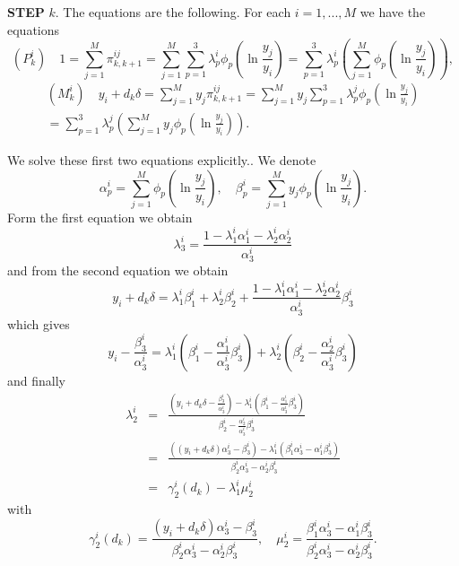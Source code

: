 \documentclass[a4paper]{article}
\begin{document}
\textbf{STEP} $k.$ The equations are the following. For each $i=1,...,M$ we
have the equations
\[
(P_{k}^{i})\quad 1 =\sum_{j=1}^{M}\pi
_{k,k+1}^{ij}=\sum_{j=1}^{M}\sum_{p=1}^{3}\lambda _{p}^{i}\phi _{p}(\ln
\frac{y_{j}}{y_{i}})=\sum_{p=1}^{3}\lambda _{p}^{i}\left( \sum_{j=1}^{M}\phi
_{p}(\ln \frac{y_{j}}{y_{i}})\right) ,\]
\begin{multline*}
(M_{k}^{i})\quad y_{i}+d_{k}\delta =\sum_{j=1}^{M}y_{j}\pi
_{k,k+1}^{ij}=\sum_{j=1}^{M}y_{j}\sum_{p=1}^{3}\lambda _{p}^{j}\phi _{p}(\ln
\frac{y_{j}}{y_{i}})\\=\sum_{p=1}^{3}\lambda _{p}^{j}\left(
\sum_{j=1}^{M}y_{j}\phi _{p}(\ln \frac{y_{j}}{y_{i}})\right) .
\end{multline*}

We solve these first two equations explicitly.. We denote
\[
\alpha _{p}^{i}=\sum_{j=1}^{M}\phi _{p}(\ln \frac{y_{j}}{y_{i}}),\quad \beta
_{p}^{i}=\sum_{j=1}^{M}y_{j}\phi _{p}(\ln \frac{y_{j}}{y_{i}}).
\]
Form the first equation we obtain
\[
\lambda _{3}^{i}=\frac{1-\lambda _{1}^{i}\alpha _{1}^{i}-\lambda
_{2}^{i}\alpha _{2}^{i}}{\alpha _{3}^{i}}
\]
and from the second equation we obtain
\[
y_{i}+d_{k}\delta =\lambda _{1}^{i}\beta _{1}^{i}+\lambda _{2}^{i}\beta
_{2}^{i}+\frac{1-\lambda _{1}^{i}\alpha _{1}^{i}-\lambda _{2}^{i}\alpha
_{2}^{i}}{\alpha _{3}^{i}}\beta _{3}^{i}
\]
which gives
\[
y_{i}-\frac{\beta _{3}^{i}}{\alpha _{3}^{i}}=\lambda _{1}^{i}(\beta _{1}^{i}-%
\frac{\alpha _{1}^{i}}{\alpha _{3}^{i}}\beta _{3}^{i})+\lambda
_{2}^{i}(\beta _{2}^{i}-\frac{\alpha _{2}^{i}}{\alpha _{3}^{i}}\beta
_{3}^{i})
\]
and finally
\begin{eqnarray*}
\lambda _{2}^{i} &=&\frac{(y_{i}+d_{k}\delta -\frac{\beta _{3}^{i}}{\alpha
_{3}^{i}})-\lambda _{1}^{i}(\beta _{1}^{i}-\frac{\alpha _{1}^{i}}{\alpha
_{3}^{i}}\beta _{3}^{i})}{\beta _{2}^{i}-\frac{\alpha _{2}^{i}}{\alpha
_{3}^{i}}\beta _{3}^{i}} \\
&=&\frac{((y_{i}+d_{k}\delta )\alpha _{3}^{i}-\beta _{3}^{i})-\lambda
_{1}^{i}(\beta _{1}^{i}\alpha _{3}^{i}-\alpha _{1}^{i}\beta _{3}^{i})}{\beta
_{2}^{i}\alpha _{3}^{i}-\alpha _{2}^{i}\beta _{3}^{i}} \\
&=&\gamma _{2}^{i}(d_{k})-\lambda _{1}^{i}\mu _{2}^{i}
\end{eqnarray*}
with
\[
\gamma _{2}^{i}(d_{k})=\frac{(y_{i}+d_{k}\delta )\alpha _{3}^{i}-\beta
_{3}^{i}}{\beta _{2}^{i}\alpha _{3}^{i}-\alpha _{2}^{i}\beta _{3}^{i}},\quad
\mu _{2}^{i}=\frac{\beta _{1}^{i}\alpha _{3}^{i}-\alpha _{1}^{i}\beta
_{3}^{i}}{\beta _{2}^{i}\alpha _{3}^{i}-\alpha _{2}^{i}\beta _{3}^{i}}.
\]
\end{document}
